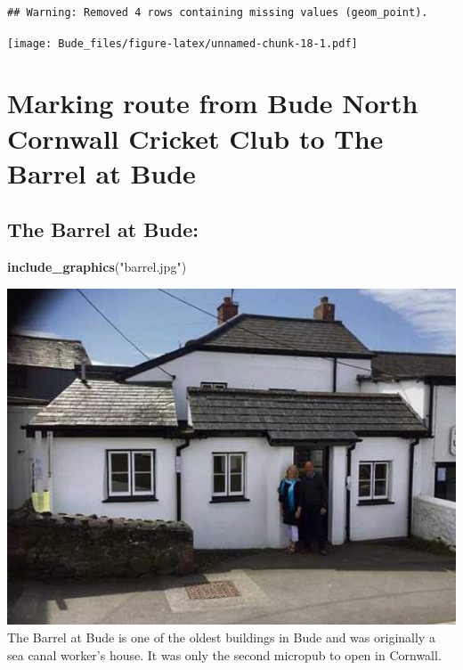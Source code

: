 \documentclass[]{article}
\newenvironment{Shaded}{\begin{snugshade}}{\end{snugshade}}
\newcommand{\DataTypeTok}[1]{\textcolor[rgb]{0.13,0.29,0.53}{#1}}
\newcommand{\DecValTok}[1]{\textcolor[rgb]{0.00,0.00,0.81}{#1}}
\newcommand{\KeywordTok}[1]{\textcolor[rgb]{0.13,0.29,0.53}{\textbf{#1}}}
\newcommand{\NormalTok}[1]{#1}
\newcommand{\OperatorTok}[1]{\textcolor[rgb]{0.81,0.36,0.00}{\textbf{#1}}}
\newcommand{\StringTok}[1]{\textcolor[rgb]{0.31,0.60,0.02}{#1}}
\begin{document}
\begin{Shaded}
\end{Shaded}

\begin{verbatim}
## Warning: Removed 4 rows containing missing values (geom_point).
\end{verbatim}

\texttt{[image: Bude\_files/figure-latex/unnamed-chunk-18-1.pdf]}

\hypertarget{marking-route-from-bude-north-cornwall-cricket-club-to-the-barrel-at-bude}{%
\section{Marking route from Bude North Cornwall Cricket Club to The
Barrel at
Bude}\label{marking-route-from-bude-north-cornwall-cricket-club-to-the-barrel-at-bude}}

\hypertarget{the-barrel-at-bude}{%
\subsection{The Barrel at Bude:}\label{the-barrel-at-bude}}

\begin{Shaded}
\begin{Highlighting}[]
\KeywordTok{include_graphics}\NormalTok{(}\StringTok{"barrel.jpg"}\NormalTok{)}
\end{Highlighting}
\end{Shaded}

\includegraphics[width=0.75\linewidth]{barrel} The Barrel at Bude is one
of the oldest buildings in Bude and was originally a sea canal worker's
house. It was only the second micropub to open in Cornwall.
\end{document}
